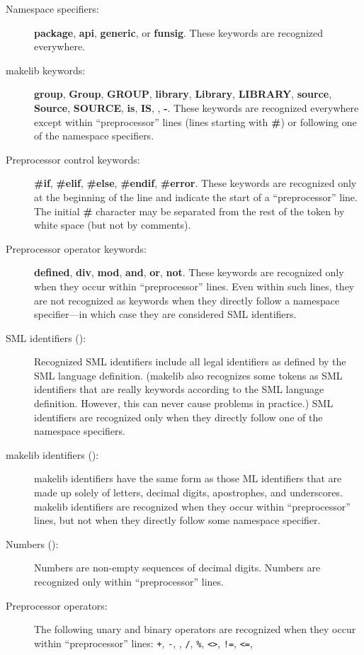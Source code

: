 \begin{description}
\item[Namespace specifiers:] {\bf package}, {\bf api},
{\bf generic}, or {\bf funsig}.  These keywords are recognized
everywhere.
\item[makelib keywords:] {\bf group}, {\bf Group}, {\bf GROUP}, {\bf
library}, {\bf Library}, {\bf LIBRARY}, {\bf source}, {\bf Source},
{\bf SOURCE}, {\bf is}, {\bf IS}, {\bf *}, {\bf -}.  These keywords
are recognized everywhere except within ``preprocessor'' lines (lines
starting with {\bf \#}) or following one of the namespace specifiers.
\item[Preprocessor control keywords:] {\bf \#if}, {\bf \#elif}, {\bf
\#else}, {\bf \#endif}, {\bf \#error}.  These keywords are recognized
only at the beginning of the line and indicate the start of a
``preprocessor'' line.  The initial {\bf \#} character may be
separated from the rest of the token by white space (but not by comments).
\item[Preprocessor operator keywords:] {\bf defined}, {\bf div}, {\bf
mod}, {\bf and}, {\bf or}, {\bf not}.  These keywords are
recognized only when they occur within ``preprocessor'' lines.  Even
within such lines, they are not recognized as keywords when they
directly follow a namespace specifier---in which case they are
considered SML identifiers.
\item[SML identifiers ():] Recognized SML identifiers
include all legal identifiers as defined by the SML language
definition. (makelib also recognizes some tokens as SML identifiers that
are really keywords according to the SML language definition. However,
this can never cause problems in practice.)  SML identifiers are
recognized only when they directly follow one of the namespace
specifiers.
\item[makelib identifiers ():] makelib identifiers have the same form
as those ML identifiers that are made up solely of letters, decimal
digits, apostrophes, and underscores.  makelib identifiers are recognized when they
occur within ``preprocessor'' lines, but not when they directly follow
some namespace specifier.
\item[Numbers ():] Numbers are non-empty sequences of
decimal digits.  Numbers are recognized only within ``preprocessor''
lines.
\item[Preprocessor operators:] The following unary and binary operators are
recognized when they occur within ``preprocessor'' lines: {\tt +},
{\tt -}, {\tt *}, {\tt /}, {\tt \%}, {\tt <>}, {\tt !=}, {\tt <=},

\end{description}
